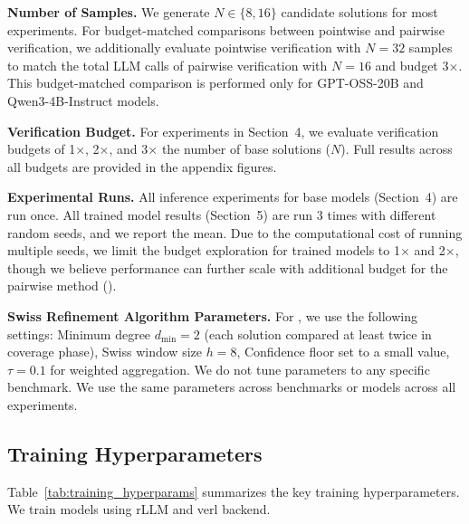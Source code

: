 \textbf{Number of Samples.} We generate $N \in \{8, 16\}$ candidate solutions for most experiments. For budget-matched comparisons between pointwise and pairwise verification, we additionally evaluate pointwise verification with $N=32$ samples to match the total LLM calls of pairwise verification with $N=16$ and budget 3$\times$. This budget-matched comparison is performed only for GPT-OSS-20B and Qwen3-4B-Instruct models.

\textbf{Verification Budget.} For \pairinfer{} experiments in Section~4, we evaluate verification budgets of 1$\times$, 2$\times$, and 3$\times$ the number of base solutions ($N$). Full results across all budgets are provided in the appendix figures.

\textbf{Experimental Runs.} All inference experiments for base models (Section~4) are run once. All trained model results (Section~5) are run 3 times with different random seeds, and we report the mean. Due to the computational cost of running multiple seeds, we limit the budget exploration for trained models to 1$\times$ and 2$\times$, though we believe performance can further scale with additional budget for the pairwise method (\pairinfer{}).

\textbf{Swiss Refinement Algorithm Parameters.} For \pairinfer{}, we use the following settings: Minimum degree $d_{\min} = 2$ (each solution compared at least twice in coverage phase), Swiss window size $h = 8$, Confidence floor set to a small value, $\tau = 0.1$ for weighted aggregation. We do not tune parameters to any specific benchmark. We use the same parameters across benchmarks or models across all experiments.

\subsection{Training Hyperparameters}

Table~\ref{tab:training_hyperparams} summarizes the key training hyperparameters. We train models using rLLM \citep{rllm2025} and verl \citep{sheng2024hybridflow} backend.

